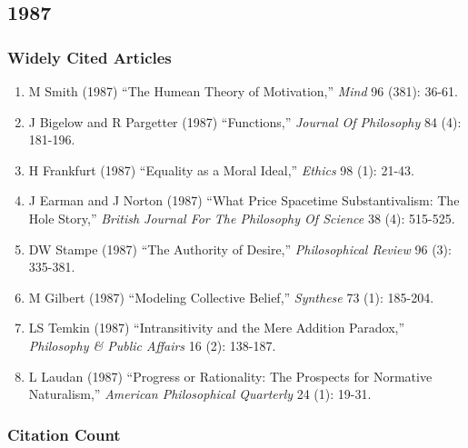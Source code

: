 \documentclass[
  10pt,
  letterpaper,
  DIV=11,
  numbers=noendperiod,
  twoside]{scrartcl}
\providecommand{\tightlist}{%
  \setlength{\itemsep}{0pt}\setlength{\parskip}{0pt}}\usepackage{longtable,booktabs,array}
\begin{document}
\newpage

\subsection{1987}\label{sec-s1987}

\subsubsection*{Widely Cited Articles}\label{widely-cited-articles-31}

\begin{enumerate}
\def\labelenumi{\arabic{enumi}.}
\tightlist
\item
  M Smith (1987) ``The Humean Theory of Motivation,'' \emph{Mind} 96
  (381): 36-61.
\item
  J Bigelow and R Pargetter (1987) ``Functions,'' \emph{Journal Of
  Philosophy} 84 (4): 181-196.
\item
  H Frankfurt (1987) ``Equality as a Moral Ideal,'' \emph{Ethics} 98
  (1): 21-43.
\item
  J Earman and J Norton (1987) ``What Price Spacetime Substantivalism:
  The Hole Story,'' \emph{British Journal For The Philosophy Of Science}
  38 (4): 515-525.
\item
  DW Stampe (1987) ``The Authority of Desire,'' \emph{Philosophical
  Review} 96 (3): 335-381.
\item
  M Gilbert (1987) ``Modeling Collective Belief,'' \emph{Synthese} 73
  (1): 185-204.
\item
  LS Temkin (1987) ``Intransitivity and the Mere Addition Paradox,''
  \emph{Philosophy \& Public Affairs} 16 (2): 138-187.
\item
  L Laudan (1987) ``Progress or Rationality: The Prospects for Normative
  Naturalism,'' \emph{American Philosophical Quarterly} 24 (1): 19-31.
\end{enumerate}

\subsubsection*{Citation Count}\label{sec-count-1987}
\end{document}
